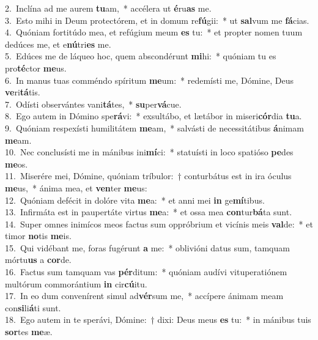 {2.~}Inclína ad me aurem \textbf{tu}am,~* accélera ut \textbf{é}ru\textbf{as} me.\\
{3.~}Esto mihi in Deum protectórem, et in domum re\textbf{fú}gii:~* ut \textbf{sal}vum me \textbf{fá}cias.\\
{4.~}Quóniam fortitúdo mea, et refúgium meum \textbf{es} tu:~* et propter nomen tuum dedúces me, et e\textbf{nú}tri\textbf{es} me.\\
{5.~}Edúces me de láqueo hoc, quem abscondérunt \textbf{mi}hi:~* quóniam tu es pro\textbf{té}ctor \textbf{me}us.\\
{6.~}In manus tuas comméndo spíritum \textbf{me}um:~* redemísti me, Dómine, Deus \textbf{ve}ri\textbf{tá}tis.\\
{7.~}Odísti observántes vani\textbf{tá}tes,~* \textbf{su}per\textbf{vá}cue.\\
{8.~}Ego autem in Dómino spe\textbf{rá}vi:~* exsultábo, et lætábor in miseri\textbf{cór}dia \textbf{tu}a.\\
{9.~}Quóniam respexísti humilitátem \textbf{me}am,~* salvásti de necessitátibus \textbf{á}nimam \textbf{me}am.\\
{10.~}Nec conclusísti me in mánibus ini\textbf{mí}ci:~* statuísti in loco spatióso \textbf{pe}des \textbf{me}os.\\
{11.~}Miserére mei, Dómine, quóniam tríbulor:~† conturbátus est in ira óculus \textbf{me}us,~* ánima mea, et \textbf{ven}ter \textbf{me}us:\\
{12.~}Quóniam defécit in dolóre vita \textbf{me}a:~* et anni mei \textbf{in} ge\textbf{mí}tibus.\\
{13.~}Infirmáta est in paupertáte virtus \textbf{me}a:~* et ossa mea \textbf{con}tur\textbf{bá}ta sunt.\\
{14.~}Super omnes inimícos meos factus sum oppróbrium et vicínis meis \textbf{val}de:~* et timor \textbf{no}tis \textbf{me}is.\\
{15.~}Qui vidébant me, foras fugérunt \textbf{a} me:~* oblivióni datus sum, tamquam mórtu\textbf{us} a \textbf{cor}de.\\
{16.~}Factus sum tamquam vas \textbf{pér}ditum:~* quóniam audívi vituperatiónem multórum commorántium \textbf{in} cir\textbf{cú}itu.\\
{17.~}In eo dum convenírent simul ad\textbf{vér}sum me,~* accípere ánimam meam con\textbf{si}li\textbf{á}ti sunt.\\
{18.~}Ego autem in te sperávi, Dómine:~† dixi: Deus meus \textbf{es} tu:~* in mánibus tuis \textbf{sor}tes \textbf{me}æ.\\
